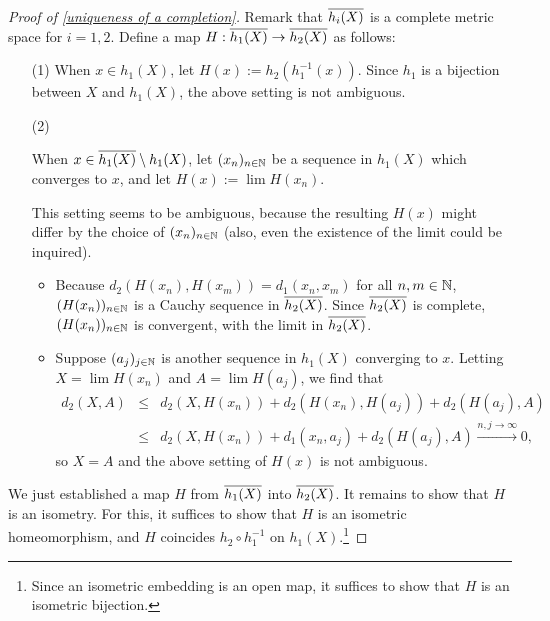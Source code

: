 \begin{proof}[Proof of \cref{uniqueness of a completion}]
    Remark that $\overline{h_i(X)}$ is a complete metric space for $i=1, 2$.
    Define a map $H: \overline{h_1(X)}\rightarrow\overline{h_2(X)}$ as follows:
    \begin{enumerate}
        \item[(1)]
        {
            When $x\in h_1(X)$, let $H(x):=h_2(h_1^{-1}(x))$.
            Since $h_1$ is a bijection between $X$ and $h_1(X)$, the above setting is not ambiguous.
        }
        \item[(2)]
        {
            When $x\in \overline{h_1(X)}\setminus h_1(X)$, let $(x_n)_{n\in{\mathbb{N}}}$ be a sequence in $h_1(X)$ which converges to $x$, and let $H(x):=\lim H(x_n)$.

            This setting seems to be ambiguous, because the resulting $H(x)$ might differ by the choice of $(x_n)_{n\in{\mathbb{N}}}$ (also, even the existence of the limit could be inquired).
            \begin{itemize}
                \item
                {
                    Because $d_2(H(x_n), H(x_m))=d_1(x_n, x_m)$ for all $n, m\in{\mathbb{N}}$, $(H(x_n))_{n\in{\mathbb{N}}}$ is a Cauchy sequence in $\overline{h_2(X)}$.
                    Since $\overline{h_2(X)}$ is complete, $(H(x_n))_{n\in{\mathbb{N}}}$ is convergent, with the limit in $\overline{h_2(X)}$.
                }
                \item
                {
                    Suppose $(a_j)_{j\in{\mathbb{N}}}$ is another sequence in $h_1(X)$ converging to $x$.
                    Letting $X=\lim H(x_n)$ and $A=\lim H(a_j)$, we find that
                    \begin{eqnarray*}
                        d_2(X, A)&\leq&d_2(X, H(x_n))+d_2(H(x_n), H(a_j))+d_2(H(a_j), A)\\
                        &\leq&d_2(X, H(x_n))+d_1(x_n, a_j)+d_2(H(a_j), A)\xrightarrow{n, j\rightarrow\infty}0,
                    \end{eqnarray*}
                    so $X=A$ and the above setting of $H(x)$ is not ambiguous.
                }
            \end{itemize}
        }
    \end{enumerate}
    We just established a map $H$ from $\overline{h_1(X)}$ into $\overline{h_2(X)}$.
    It remains to show that $H$ is an isometry.
    For this, it suffices to show that $H$ is an isometric homeomorphism, and $H$ coincides $h_2\circ h_1^{-1}$ on $h_1(X)$.\footnote{Since an isometric embedding is an open map, it suffices to show that $H$ is an isometric bijection.}

\end{proof}
